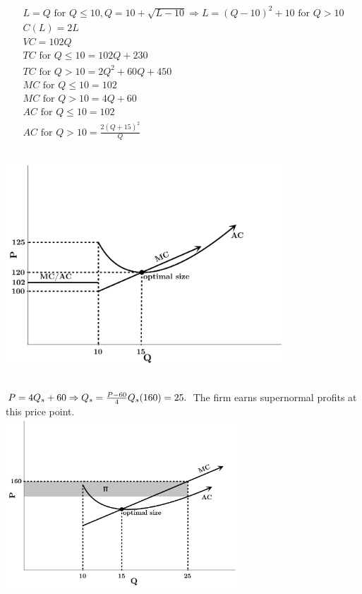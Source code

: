 \documentclass{article}
\begin{document}
	\subsection[b]{}
		\setcounter{equation}{0}
		\begin{align}
			L=Q \textrm{ for } Q \leq 10, Q=10+\sqrt{L-10} \Rightarrow L = (Q-10)^2+10 \textrm{ for }  Q>10 \\
			C(L)=2L \\
			VC = 102Q \\
			TC \textrm{ for } Q \leq 10 = 102Q + 230 \\
			TC \textrm{ for } Q > 10 = 2 Q^2+60 Q+450\\
			MC \textrm{ for }Q \leq 10 = 102\\
			MC \textrm{ for }Q > 10 = 4Q+60 \\
			AC \textrm{ for }Q \leq 10 = 102\\
			AC \textrm{ for }Q > 10 = \frac{2(Q+15)^2}{Q}			
		\end{align}
	\subsection[c]{}				
		\includegraphics[height=3in]{Charts/5c}		
	\subsection[d]{}
		$ P = 4Q_s+60 \Rightarrow Q_s = \frac{P-60}{4} \\
		Q_s(160)=25.$ The firm earns supernormal profits at this price point. \\
		\includegraphics[height=2.5in]{Charts/5d}
\end{document}
